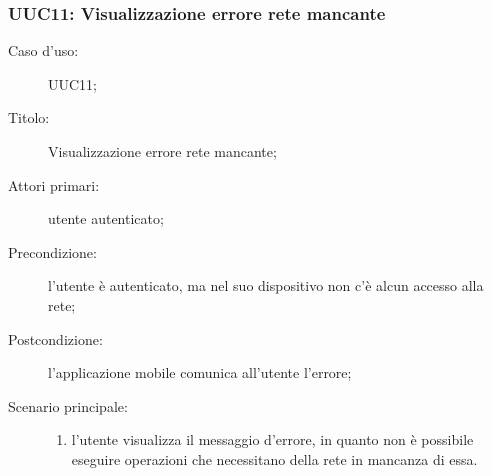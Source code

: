 \documentclass[../../../analisi-dei-requisiti.tex]{subfiles}
\begin{document}
\subsubsection{UUC11: Visualizzazione errore rete mancante}%
\label{subs:UUC11}

\begin{description}
  \item[Caso d'uso:] UUC11;
  \item[Titolo:] Visualizzazione errore rete mancante;
  \item[Attori primari:] utente autenticato;
  \item[Precondizione:] l'utente è autenticato, ma nel suo dispositivo non c'è alcun accesso alla rete;
  \item[Postcondizione:] l'applicazione mobile comunica all'utente l'errore;
  \item[Scenario principale:]
        \begin{enumerate}
          \item l'utente visualizza il messaggio d'errore, in quanto non è possibile eseguire operazioni che necessitano della rete in mancanza di essa.
        \end{enumerate}
\end{description}
\end{document}
